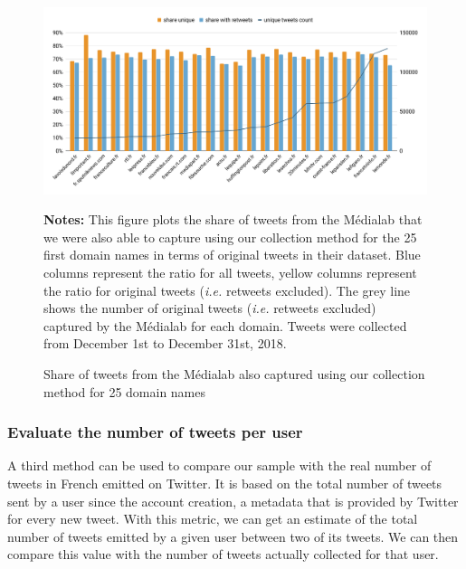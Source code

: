 \begin{figure}
\begin{center}
\includegraphics[width=1\textwidth]{figures/ShareInCommonWithMedialab.pdf}
\end{center}
\scriptsize \textbf{Notes:} This figure plots the share of tweets from the Médialab that we were also able to capture using our collection method for the 25 first domain names in terms of original tweets in their dataset. Blue columns represent the ratio for all tweets, yellow columns represent the ratio for original tweets (\textit{i.e.} retweets excluded). The grey line shows the number of original tweets (\textit{i.e.} retweets excluded) captured by the Médialab for each domain. Tweets were collected from December 1st to December 31st, 2018.

\caption{Share of tweets from the Médialab also captured using our collection method for 25 domain names}
\label{Figure:HistogramUrlsMedialab}
\end{figure}

\subsubsection{Evaluate the number of tweets per user}

A third method can be used to compare our sample with the real number of tweets in French emitted on Twitter. It is based on the total number of tweets sent by a user since the account creation, a metadata that is provided by Twitter for every new tweet. With this metric, we can get an estimate of the total number of tweets emitted by a given user between two of its tweets. We can then compare this value with the number of tweets actually collected for that user.

